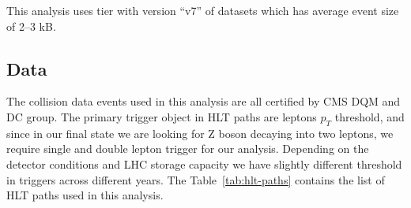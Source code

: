 This analysis uses \NanoAOD{} tier with version ``v7'' of datasets
which has average event size of 2--3 kB.

\subsection{
  Data
}

The collision data events used in this analysis are all certified
by \gls{CMS} \gls{DQM} and \gls{DC} group. The primary trigger object in
\gls{HLT} paths are leptons \( p_{T} \) threshold, and since in our final state
we are looking for Z boson decaying into two leptons, we require single and
double lepton trigger for our analysis. Depending on the detector
conditions and \gls{LHC} storage capacity we have slightly different threshold
in triggers across different years. The Table~\ref{tab:hlt-paths} contains the list of
\gls{HLT} paths used in this analysis.

